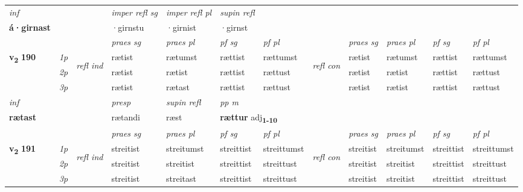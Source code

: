 \begin{longtable}[l]{X>{\footnotesize\itshape}llXXXXlXXXX}
   {\textit{inf}} & &   & \textit{imper refl sg} & \textit{imper refl pl}   & \textit{supin refl}  \\*
  {\textbf{á\allowbreak ·girnast}} & &   & ·girnstu & ·girnist   & ·girnst  \\*

\midrule

 & &   & \textit{praes sg}  & \textit{praes pl}    & \textit{ pf sg} & \textit{pf pl} & & \textit{praes sg}  & \textit{praes pl}    & \textit{pf sg} & \textit{pf pl }  \\ \cmidrule{4-7} \cmidrule{9-12}
 \multirow{2}{*}{{{\textbf{v{\textsubscript{2}}} \Large{\textbf{190}}}}}  & 1p & \multirow{3}{*}{\begin{turn}{90}\textit{refl ind}\end{turn}}  & rætist & rætumst & rættist & rættumst & \multirow{3}{*}{\begin{turn}{90}\textit{refl con}\end{turn}}  &rætist & rætumst & rættist & rættumst \\*
 & 2p &  & rætist & rætist & rættist & rættust & &rætist & rætist & rættist & rættust \\*
 & 3p  & & rætist & rætast & rættist & rættust & & rætist & rætist& rættist & rættust \\*
\cmidrule{4-7} \cmidrule{9-12}

   {\textit{inf}} & &     & \textit{presp}  & \textit{supin refl} & \textit{pp m} \\*
  {\textbf{rætast}} & &     & rætandi  & ræst & \multicolumn{2}{l}{\textbf{rættur} adj\textbf{\textsubscript{1-10}}} \\*

\midrule

 & &   & \textit{praes sg}  & \textit{praes pl}    & \textit{ pf sg} & \textit{pf pl} & & \textit{praes sg}  & \textit{praes pl}    & \textit{pf sg} & \textit{pf pl }  \\ \cmidrule{4-7} \cmidrule{9-12}
 \multirow{2}{*}{{{\textbf{v{\textsubscript{2}}} \Large{\textbf{191}}}}}  & 1p & \multirow{3}{*}{\begin{turn}{90}\textit{refl ind}\end{turn}}  & streitist & streitumst & streittist & streittumst & \multirow{3}{*}{\begin{turn}{90}\textit{refl con}\end{turn}}  &streitist & streitumst & streittist & streittumst \\*
 & 2p &  & streitist & streitist & streittist & streittust & &streitist & streitist & streittist & streittust \\*
 & 3p  & & streitist & streitast & streittist & streittust & & streitist & streitist& streittist & streittust \\*
\cmidrule{4-7} \cmidrule{9-12}


\end{longtable}
